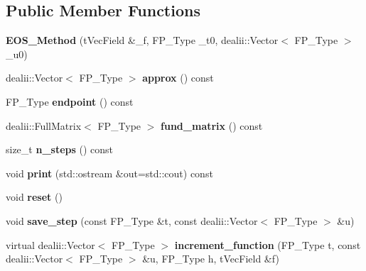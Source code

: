 \subsection*{Public Member Functions}
\begin{DoxyCompactItemize}
\item 
\mbox{\label{classEOS__Method_ab1c44a70bbbcdda56efdd788e49bfd80}} 
{\bfseries E\+O\+S\+\_\+\+Method} (t\+Vec\+Field \&\+\_\+f, F\+P\+\_\+\+Type \+\_\+t0, dealii\+::\+Vector$<$ F\+P\+\_\+\+Type $>$ \+\_\+u0)
\item 
\mbox{\label{classEOS__Method_a51157a38f285e475337c4e67d1ccd279}} 
dealii\+::\+Vector$<$ F\+P\+\_\+\+Type $>$ {\bfseries approx} () const
\item 
\mbox{\label{classEOS__Method_a3f7157f6b6518ea3395f90b3c5a795b8}} 
F\+P\+\_\+\+Type {\bfseries endpoint} () const
\item 
\mbox{\label{classEOS__Method_aa733b1416d87f4382d4b6abd24c59013}} 
dealii\+::\+Full\+Matrix$<$ F\+P\+\_\+\+Type $>$ {\bfseries fund\+\_\+matrix} () const
\item 
\mbox{\label{classEOS__Method_aa323926fa9f41a8a011c1a370c2bed7d}} 
size\+\_\+t {\bfseries n\+\_\+steps} () const
\item 
\mbox{\label{classEOS__Method_ae7f7cd39eddbc7dde0c004773c00ad6e}} 
void {\bfseries print} (std\+::ostream \&out=std\+::cout) const
\item 
\mbox{\label{classEOS__Method_a2abc87316deb095a84ed74e1ddfd56ec}} 
void {\bfseries reset} ()
\item 
\mbox{\label{classEOS__Method_a8f1d297e535ca2ca7441bafcea43742c}} 
void {\bfseries save\+\_\+step} (const F\+P\+\_\+\+Type \&t, const dealii\+::\+Vector$<$ F\+P\+\_\+\+Type $>$ \&u)
\item 
\mbox{\label{classEOS__Method_abfd4da141c0877b5d52bafec5179d385}} 
virtual dealii\+::\+Vector$<$ F\+P\+\_\+\+Type $>$ {\bfseries increment\+\_\+function} (F\+P\+\_\+\+Type t, const dealii\+::\+Vector$<$ F\+P\+\_\+\+Type $>$ \&u, F\+P\+\_\+\+Type h, t\+Vec\+Field \&f)

\end{DoxyCompactItemize}
